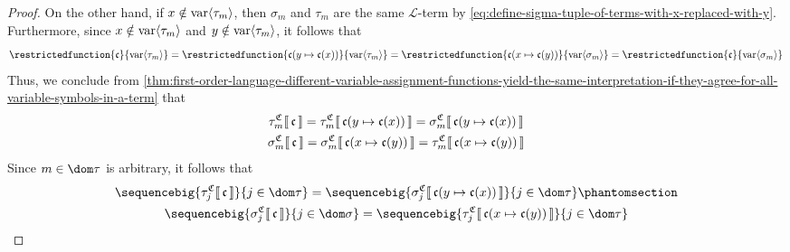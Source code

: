 \begin{proof}
    \vspace{0.3cm}
    \noindent
    On the other hand, if \( x \notin \operatorname{var} \langle\tau_{m}\rangle \), then \( \sigma_{m} \) and \( \tau_{m} \) are the same \( \mathcal{L} \)-term by
    \eqref{eq:define-sigma-tuple-of-terms-with-x-replaced-with-y}. Furthermore, since \( x \notin \operatorname{var} \langle\tau_{m}\rangle \) and \( y \notin \operatorname{var} \langle\tau_{m}\rangle \),
    it follows that
    \begin{equation*}
        \restrictedfunction{\mathfrak{c}}{\folvars{\tau_{m}}} =
        \restrictedfunction{ \folmodifiedvariableassignmentfunction{\mathfrak{c}}{y}{\mathfrak{c}(x)} }{\folvars{\tau_{m}}} =
        \restrictedfunction{ \folmodifiedvariableassignmentfunction{\mathfrak{c}}{x}{\mathfrak{c}(y)} }{\folvars{\sigma_{m}}} =
        \restrictedfunction{\mathfrak{c}}{\folvars{\sigma_{m}}}
    \end{equation*}
    Thus, we conclude from \cref{thm:first-order-language-different-variable-assignment-functions-yield-the-same-interpretation-if-they-agree-for-all-variable-symbols-in-a-term}
    that
    \begin{gather*}
        \folterminterpretation{\tau_{m}}{\mathfrak{C}}{\mathfrak{c}} =
        \folterminterpretation{\tau_{m}}{\mathfrak{C}}{ \folmodifiedvariableassignmentfunction{\mathfrak{c}}{y}{ \mathfrak{c}(x) } } =
        \folterminterpretation{\sigma_{m}}{\mathfrak{C}}{ \folmodifiedvariableassignmentfunction{\mathfrak{c}}{y}{ \mathfrak{c}(x) } }\\
        \folterminterpretation{\sigma_{m}}{\mathfrak{C}}{\mathfrak{c}} =
        \folterminterpretation{\sigma_{m}}{\mathfrak{C}}{ \folmodifiedvariableassignmentfunction{\mathfrak{c}}{x}{\mathfrak{c}(y)} } =
        \folterminterpretation{\tau_{m}}{\mathfrak{C}}{ \folmodifiedvariableassignmentfunction{\mathfrak{c}}{x}{\mathfrak{c}(y)} }
    \end{gather*}
    Since \( m \in \dom \tau \) is arbitrary, it follows that
    \begin{gather}
        \sequencebig{ \folterminterpretation{\tau_{j}}{\mathfrak{C}}{\mathfrak{c}} }{ j \in \dom \tau } =
        \sequencebig{ \folterminterpretation{\sigma_{j}}{\mathfrak{C}}{ \folmodifiedvariableassignmentfunction{\mathfrak{c}}{y}{\mathfrak{c}(x)} } }{ j \in \dom \tau }
        \phantomsection \label{eq:interpreted-tau-and-sigma-are-equal-1}\\
        \sequencebig{ \folterminterpretation{\sigma_{j}}{\mathfrak{C}}{\mathfrak{c}} }{ j \in \dom \sigma } =
        \sequencebig{ \folterminterpretation{\tau_{j}}{\mathfrak{C}}{ \folmodifiedvariableassignmentfunction{\mathfrak{c}}{x}{\mathfrak{c}(y)} } }{ j \in \dom \tau }

\end{gather}
\end{proof}
